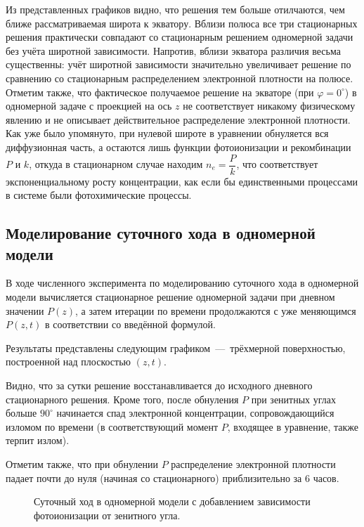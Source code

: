 \documentclass[14pt, a4paper, fleqn]{extarticle}
\begin{document}
Из представленных графиков видно, что решения тем больше отилчаются, чем ближе рассматриваемая широта к экватору. Вблизи полюса все три стационарных решения практически совпадают со стационарным решением одномерной задачи без учёта широтной зависимости. Напротив, вблизи экватора различия весьма существенны: учёт широтной зависимости значительно увеличивает решение по сравнению со стационарным распределением электронной плотности на полюсе. Отметим также, что фактическое получаемое решение на экваторе (при $\varphi = 0^\circ$) в одномерной задаче с проекцией на ось $z$ не соответствует никакому физическому явлению и не описывает действительное распределение электронной плотности. Как уже было упомянуто, при нулевой широте в уравнении обнуляется вся диффузионная часть, а остаются лишь функции фотоионизации и рекомбинации $P$ и $k$, откуда в стационарном случае находим $n_e = \dfrac{P}{k}$, что соответствует экспоненциальному росту концентрации, как если бы единственными процессами в системе были фотохимические процессы.




\subsection{Моделирование суточного хода в одномерной модели}


В ходе численного эксперимента по моделированию суточного хода в одномерной модели вычисляется стационарное решение одномерной задачи при дневном значении $P(z)$, а затем итерации по времени продолжаются с уже меняющимся $P(z, t)$ в соответствии со введённой формулой.

Результаты представлены следующим графиком~---~трёхмерной поверхностью, построенной над плоскостью $(z, t)$.

Видно, что за сутки решение восстанавливается до исходного дневного стационарного решения. Кроме того, после обнуления $P$ при зенитных углах больше $90^\circ$ начинается спад электронной концентрации, сопровождающийся изломом по времени (в соответствующий  момент $P$, входящее в уравнение, также терпит излом).

Отметим также, что при обнулении $P$ распределение электронной плотности падает почти до нуля (начиная со стационарного)  приблизительно за $6$ часов.

\begin{figure}[H]
\caption{Суточный ход в одномерной модели с добавлением зависимости фотоионизации от зенитного угла.}
\end{figure}
\end{document}
